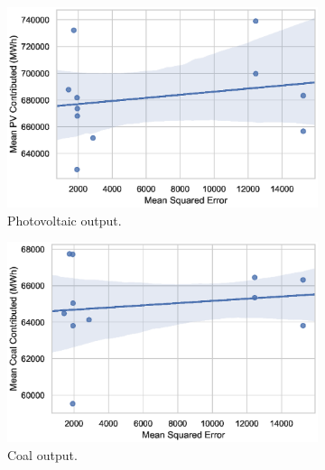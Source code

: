 \begin{figure}[h!]
\centering
\begin{subfigure}[b]{0.3\textwidth}
\includegraphics[width=\columnwidth]{Chapter5/figures/market-forecasting/results/elecsim_results/results_2/contributed_PV_mean_output}
\caption{Photovoltaic output.}
\label{fig:contributed_PV_mean_output}
\end{subfigure}
\hfil
\begin{subfigure}[b]{0.3\textwidth}  
\includegraphics[width=\columnwidth]{Chapter5/figures/market-forecasting/results/elecsim_results/results_2/contributed_Coal_mean_output.eps}
\caption{Coal output.}
\label{fig:contributed_Coal_mean_output}
\end{subfigure}
\hfil
\begin{subfigure}[b]{0.3\textwidth}   

\end{subfigure}
\end{figure}
